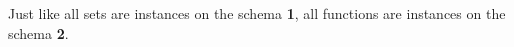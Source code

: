 Just like all sets are instances on the schema \textbf{1}, all functions are instances on the schema \textbf{2}.
